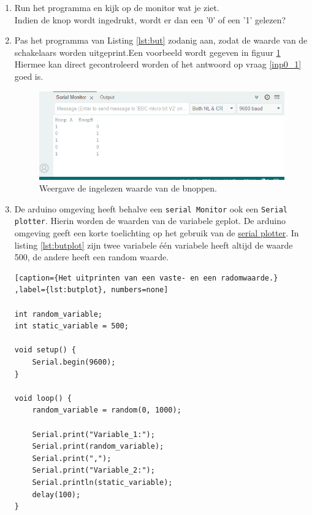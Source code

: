 \begin{enumerate}[label=\alph*)]
\item \label{inp0_1} 
Run het programma en kijk op de monitor wat je ziet. \\ Indien de knop wordt ingedrukt, wordt er dan een '0' of een '1' gelezen?
\item \label{butNr}
Pas het  programma van Listing \ref{lst:but} zodanig aan, zodat de waarde van de schakelaars worden uitgeprint.Een voorbeeld wordt gegeven in figuur \ref{fig:button} Hiermee kan direct gecontroleerd worden of het antwoord op vraag \ref{inp0_1} goed is.
\begin{figure}[H]
	\captionsetup{justification=centering}
	\includegraphics[width=0.6 \linewidth]{figuren/monitorButton}
	\centering
	\caption{Weergave de ingelezen waarde van de bnoppen.}
	\label{fig:button}
\end{figure}
\item De arduino omgeving heeft behalve een \texttt{serial Monitor} ook een \texttt{Serial plotter}. Hierin worden de waarden van de variabele geplot.
De arduino omgeving geeft een korte toelichting op het gebruik van de \href{https://docs.arduino.cc/software/ide-v2/tutorials/ide-v2-serial-plotter/}{serial plotter}. In listing \ref{lst:butplot} zijn twee variabele één variabele heeft altijd de waarde 500, de andere heeft een random waarde.
\begin{lstlisting}[caption={Het uitprinten van een vaste- en een radomwaarde.} ,label={lst:butplot}, numbers=none]
	
int random_variable;
int static_variable = 500;

void setup() {
	Serial.begin(9600);
}

void loop() {
	random_variable = random(0, 1000);
	
	Serial.print("Variable_1:");
	Serial.print(random_variable);
	Serial.print(",");
	Serial.print("Variable_2:");
	Serial.println(static_variable);
	delay(100);
}
	

\end{lstlisting}
\end{enumerate}
